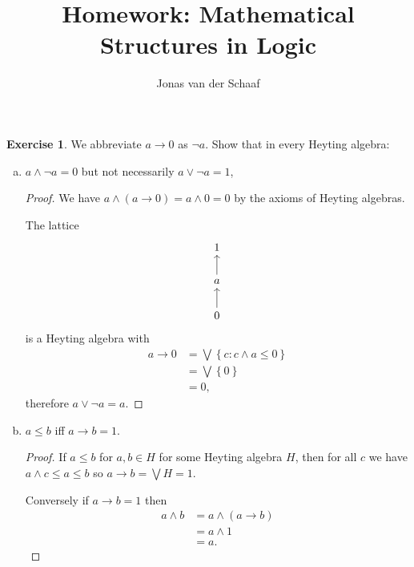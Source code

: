 \documentclass{article}
\title{Homework: Mathematical Structures in Logic}
\author{Jonas van der Schaaf}
\date{}
\newcommand{\set}[1]{\left\{#1\right\}}
\newcommand{\setwith}[2]{\set{#1:#2}}
\theoremstyle{definition}
\newtheorem{question}{Exercise}
\begin{document}
\maketitle

\begin{question}
    We abbreviate \(a\to 0\) as \(\neg a\). Show that in every Heyting algebra:
    \begin{enumerate}[(a)]
        \item \(a\wedge\neg a=0\) but not necessarily \(a\vee\neg a=1\),

              \begin{proof}
                  We have \(a\wedge(a\to 0)=a\wedge0=0\) by the axioms of Heyting
                  algebras.

                  The lattice
                  \[
                      \begin{tikzcd}[ampersand replacement=\&]
                          1 \\
                          a \\
                          0
                          \arrow[from=3-1, to=2-1]
                          \arrow[from=2-1, to=1-1]
                      \end{tikzcd}
                  \]
                  is a Heyting algebra with
                  \begin{align*}
                      a\to 0 & =\bigvee\setwith{c}{c\wedge a\leq 0} \\
                             & =\bigvee\set{0}                      \\
                             & =0,
                  \end{align*}
                  therefore \(a\vee\neg a=a\).
              \end{proof}

        \item \(a\leq b\) iff \(a\to b=1\).

              \begin{proof}
                  If \(a\leq b\) for \(a,b\in H\) for some Heyting algebra \(H\), then
                  for all \(c\) we have \(a\wedge c\leq a\leq b\) so \(a\to b=\bigvee
                  H=1\).

                  Conversely if \(a\to b=1\) then
                  \begin{align*}
                      a\wedge b & =a\wedge(a\to b) \\
                                & =a\wedge1        \\
                                & =a.
                  \end{align*}
              \end{proof}


\end{enumerate}
\end{question}
\end{document}
